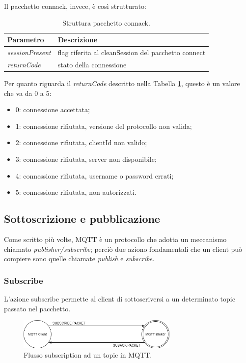 \documentclass[Lau,binding=0.6cm,noexaminfo=true]{sapthesis}
\begin{document}
\begin{large}
Il pacchetto connack, invece, è così strutturato: \\
\begin{table}[h]
\caption{Struttura pacchetto connack.}
\label{tab:connack}
\begin{tabular}{lp{}}
\toprule
\textbf{Parametro} & \textbf{Descrizione} \\
\midrule
\textit{sessionPresent} & flag riferita al cleanSession del pacchetto connect \\
\textit{returnCode} & stato della connessione \\
\bottomrule
\end{tabular}
\end{table}

Per quanto riguarda il \textit{returnCode} descritto nella Tabella \ref{tab:connack}, questo è un valore che va da 0 a 5:
\begin{itemize}
\item 0: connessione accettata;
\item 1: connessione rifiutata, versione del protocollo non valida;
\item 2: connessione rifiutata, clientId non valido;
\item 3: connessione rifiutata, server non disponibile;
\item 4: connessione rifiutata, username o password errati;
\item 5: connessione rifiutata, non autorizzati.
\end{itemize}

\subsection{Sottoscrizione e pubblicazione}
Come scritto più volte, MQTT è un protocollo che adotta un meccanismo chiamato \textit{publisher/subscribe}; perciò due aziono fondamentali che un client può compiere sono quelle chiamate \textit{publish} e \textit{subscribe}.
\subsubsection{Subscribe}
L'azione subscribe permette al client di sottoscriversi a un determinato topic passato nel pacchetto.

\begin{figure}[h]
\centering
\includegraphics[width=0.7\textwidth]{images/subscribe-suback.png}
\caption{Flusso subscription ad un topic in MQTT.}
\label{fig:subscribe-suback}
\end{figure}


\end{large}
\end{document}
